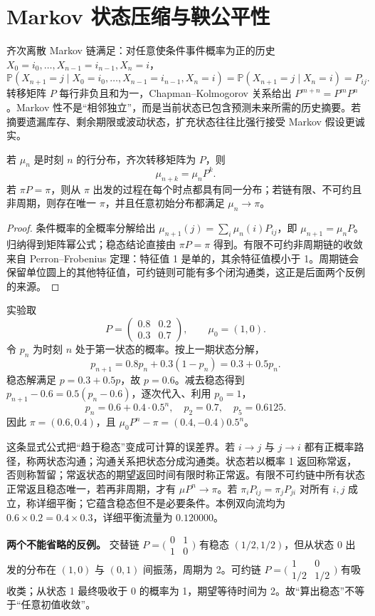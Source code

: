\section{Markov 状态压缩与鞅公平性}

齐次离散 Markov 链满足：对任意使条件事件概率为正的历史
$X_0=i_0,\ldots,X_{n-1}=i_{n-1},X_n=i$，
\[
 \mathbb P(X_{n+1}=j\mid
 X_0=i_0,\ldots,X_{n-1}=i_{n-1},X_n=i)
 =\mathbb P(X_{n+1}=j\mid X_n=i)=P_{ij}.
\]
转移矩阵 $P$ 每行非负且和为一，Chapman--Kolmogorov 关系给出 $P^{m+n}=P^mP^n$。Markov 性不是“相邻独立”，而是当前状态已包含预测未来所需的历史摘要。若摘要遗漏库存、剩余期限或波动状态，扩充状态往往比强行接受 Markov 假设更诚实。

\begin{proposition}[有限状态链的矩阵递推]
若 $\mu_n$ 是时刻 $n$ 的行分布，齐次转移矩阵为 $P$，则
\[
  \mu_{n+k}=\mu_nP^k.
\]
若 $\pi P=\pi$，则从 $\pi$ 出发的过程在每个时点都具有同一分布；若链有限、不可约且非周期，则存在唯一 $\pi$，并且任意初始分布都满足 $\mu_n\to\pi$。
\end{proposition}
\begin{proof}
条件概率的全概率分解给出 $\mu_{n+1}(j)=\sum_i\mu_n(i)P_{ij}$，即 $\mu_{n+1}=\mu_nP$。归纳得到矩阵幂公式；稳态结论直接由 $\pi P=\pi$ 得到。有限不可约非周期链的收敛来自 Perron--Frobenius 定理：特征值 1 是单的，其余特征值模小于 1。周期链会保留单位圆上的其他特征值，可约链则可能有多个闭沟通类，这正是后面两个反例的来源。
\end{proof}

实验取
\[
P=\begin{pmatrix}0.8&0.2\\0.3&0.7\end{pmatrix},\qquad \mu_0=(1,0).
\]
令 $p_n$ 为时刻 $n$ 处于第一状态的概率。按上一期状态分解，
\[
p_{n+1}=0.8p_n+0.3(1-p_n)=0.3+0.5p_n.
\]
稳态解满足 $p=0.3+0.5p$，故 $p=0.6$。减去稳态得到 $p_{n+1}-0.6=0.5(p_n-0.6)$，逐次代入、利用 $p_0=1$，
\[
p_n=0.6+0.4\cdot0.5^n,\quad p_2=0.7,\quad p_5=0.6125.
\]
因此 $\pi=(0.6,0.4)$，且 $\mu_0P^n-\pi=(0.4,-0.4)0.5^n$。


这条显式公式把“趋于稳态”变成可计算的误差界。若 $i\to j$ 与 $j\to i$ 都有正概率路径，称两状态沟通；沟通关系把状态分成沟通类。状态若以概率 1 返回称常返，否则称暂留；常返状态的期望返回时间有限时称正常返。有限不可约链中所有状态正常返且稳态唯一，若再非周期，才有 $\mu P^n\to\pi$。若 $\pi_iP_{ij}=\pi_jP_{ji}$ 对所有 $i,j$ 成立，称详细平衡；它蕴含稳态但不是必要条件。本例双向流均为 $0.6\times0.2=0.4\times0.3$，详细平衡流量为 $0.120000$。

\noindent\textbf{两个不能省略的反例。}\quad
交替链 $P=\bigl(\begin{smallmatrix}0&1\\1&0\end{smallmatrix}\bigr)$ 有稳态 $(1/2,1/2)$，但从状态 0 出发的分布在 $(1,0)$ 与 $(0,1)$ 间振荡，周期为 2。可约链 $P=\bigl(\begin{smallmatrix}1&0\\1/2&1/2\end{smallmatrix}\bigr)$ 有吸收类；从状态 1 最终吸收于 0 的概率为 1，期望等待时间为 2。故“算出稳态”不等于“任意初值收敛”。

